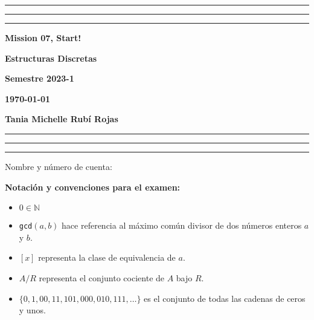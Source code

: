 \documentclass[12pt, a4paper]{exam}
\begin{document}
    \centering
    \hrule \hrule \hrule 
    \vspace{5mm}
    \begin{minipage}[c]{0.8\textwidth}
        \begin{center}
            {\large\textbf{Mission 07, Start!} \par
            \large \textbf{Estructuras Discretas} \par
            \large \textbf{Semestre 2023-1} \par
            \large \textbf{\today}	\par}
        \end{center}
    \end{minipage}

    \vspace{0.2in}
    \noindent
    \textbf{Tania Michelle Rubí Rojas}
    \vspace{2mm}
    \hrule \hrule \hrule 

    \vspace{5mm}
    \noindent
    Nombre y número de cuenta: \hrulefill\

    \vspace{5mm}
    \noindent
    
    \textbf{Notación y convenciones para el examen:}
    {\tiny
    \begin{multicols}{2}
    \begin{itemize}\setlength\itemsep{0em}  
      \item $0\in\mathbb{N}$

      \item \texttt{gcd}$(a,b)$ hace referencia al máximo común divisor de dos 
      números enteros $a$ y $b$. 

      \item $[x]$ representa la clase de equivalencia de $a$. 
      
      \item $A/R$ representa el conjunto cociente de $A$ bajo $R$.
      
      \item $\{0,1,00,11,101,000,010,111, \ldots\}$ es el conjunto de todas 
      las cadenas de ceros y unos. 
    \end{itemize}
    \end{multicols}
    }
\end{document}
